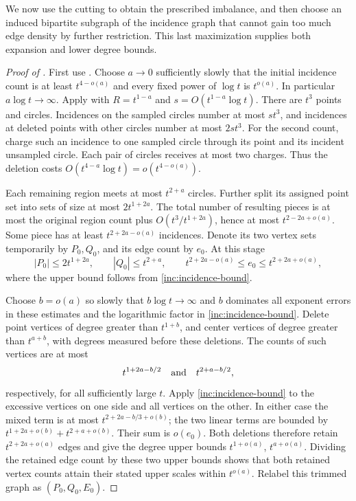 We now use the cutting to obtain the prescribed imbalance, and then
choose an induced bipartite subgraph of the incidence graph that cannot gain too much
edge density by further restriction. This last maximization supplies
both expansion and lower degree bounds.

\begin{proof}[Proof of ]
First use . Choose \(a\to0\) sufficiently
slowly that the initial incidence count is at least \(t^{4-o(a)}\)
and every fixed power of \(\log t\) is \(t^{o(a)}\). In particular
\(a\log t\to\infty\). Apply  with
\(R=t^{1-a}\) and \(s=O(t^{1-a}\log t)\). There are \(t^3\)
points and circles. Incidences on the sampled circles number at most
\(s t^3\), and incidences at deleted points with other circles number
at most \(2s t^3\). For the second count, charge such an incidence
to one sampled circle through its point and its incident unsampled
circle. Each pair of circles receives at most two charges. Thus the deletion costs
\(O(t^{4-a}\log t)=o(t^{4-o(a)})\).

Each remaining region meets at most \(t^{2+a}\) circles. Further split
its assigned point set into sets of size at most \(2t^{1+2a}\).
The total number of resulting pieces is at most the original region
count plus \(O(t^3/t^{1+2a})\), hence at most
\(t^{2-2a+o(a)}\). Some piece has at least
\(t^{2+2a-o(a)}\) incidences. Denote its two vertex sets temporarily
by \(P_0,Q_0\), and its edge count by \(e_0\). At this stage
\[
 |P_0|\le 2t^{1+2a},\qquad |Q_0|\le t^{2+a},\qquad
 t^{2+2a-o(a)}\le e_0\le t^{2+2a+o(a)},
\]
where the upper bound follows from \eqref{inc:incidence-bound}.

Choose \(b=o(a)\) so slowly that \(b\log t\to\infty\) and \(b\)
dominates all exponent errors in these estimates and the logarithmic factor in \eqref{inc:incidence-bound}. Delete point vertices of degree
greater than \(t^{1+b}\), and center vertices of degree greater than
\(t^{a+b}\), with degrees measured before these deletions. The counts
of such vertices are at most
\[
 t^{1+2a-b/2}\quad\hbox{and}\quad t^{2+a-b/2},
\]
respectively, for all sufficiently large \(t\). Apply
\eqref{inc:incidence-bound} to the excessive vertices on one side and
all vertices on the other. In either case the mixed term is at most
\(t^{2+2a-b/3+o(b)}\); the two linear terms are bounded by
\(t^{1+2a+o(b)}+t^{2+a+o(b)}\). Their sum is \(o(e_0)\).
Both deletions therefore retain \(t^{2+2a+o(a)}\) edges and give
the degree upper bounds \(t^{1+o(a)}\), \(t^{a+o(a)}\).
Dividing the retained edge count by these two upper bounds shows that
both retained vertex counts attain their stated upper scales within
\(t^{o(a)}\). Relabel this trimmed graph as \((P_0,Q_0,E_0)\).


\end{proof}
